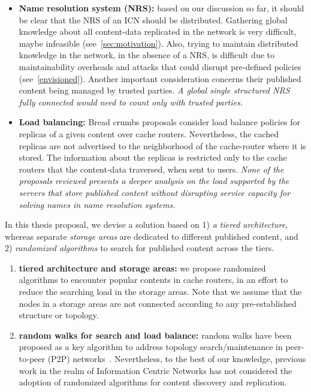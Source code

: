 \begin{itemize}
\item \textbf{Name resolution system (NRS): }  
based on our discussion so far, it should be clear that the NRS  of an ICN 
should be distributed.  Gathering global knowledge about all content-data replicated in the network is 
very difficult, maybe infeasible (see~\textsection\ref{sec:motivation}).  
Also, trying to maintain distributed knowledge in the network, 
in the absence of a NRS, is difficult due to maintainability overheads  
and attacks that could disrupt pre-defined policies (see~\textsection\ref{envisioned}). Another important consideration concerns their
 published content being managed by trusted parties. \emph{A global single structured NRS fully 
connected would need to count only with trusted parties.  }
\item \textbf{Load balancing: }  
Bread crumbs proposals consider load balance policies for replicas of a given 
content over cache routers. 
Nevertheless, the cached replicas are not advertised to the neighborhood of the cache-router where it is stored.
  The information about the replicas is restricted only to the cache routers that the content-data traversed, when sent to users.
\emph{None of the proposals reviewed presents a deeper analysis on the load supported 
by the servers that store published content without disrupting service capacity for solving names 
in name resolution systems. }
\end{itemize}



In this thesis proposal, we devise a solution based on 1) \emph{a tiered architecture}, whereas
 separate \emph{storage areas} are dedicated to different published content, and 2) 
\emph{randomized algorithms} to search for published content across the tiers. 

\begin{enumerate}
\item \textbf{tiered architecture and storage areas: }  we propose randomized  algorithms to encounter popular 
contents in cache routers, in an effort to reduce the searching load in the storage areas. 
Note that we assume that the nodes in a storage areas are not connected according to any pre-established structure or topology. 
\item \textbf{random walks for search and load balance: } random walks have been proposed as a key algorithm
to  address 
topology search/maintenance in peer-to-peer (P2P) networks~\cite{nearoptimal}.
Nevertheless, to the best of our knowledge, previous work in the realm of Information Centric Networks  
has not considered the adoption of  randomized  algorithms for content discovery and replication. 
\end{enumerate}


